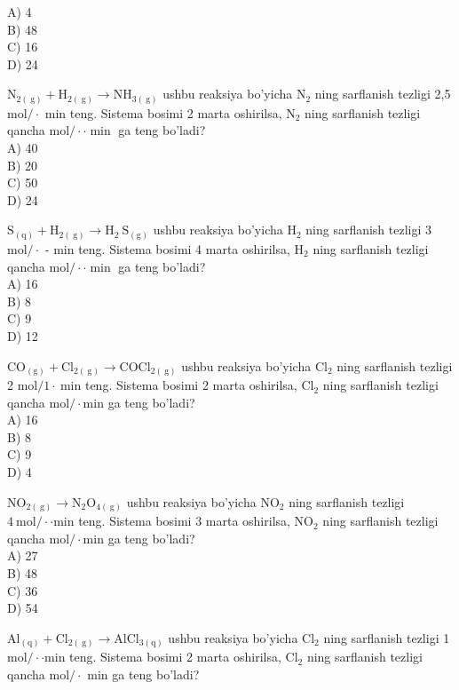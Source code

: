 A) 4\\
B) 48\\
C) 16\\
D) 24
  \item $\mathrm{N}_{2(\mathrm{~g})}+\mathrm{H}_{2(\mathrm{~g})} \rightarrow \mathrm{NH}_{3(\mathrm{~g})}$ ushbu reaksiya bo'yicha $\mathrm{N}_{2}$ ning sarflanish tezligi 2,5 $\mathrm{mol} / \cdot$ min teng. Sistema bosimi 2 marta oshirilsa, $\mathrm{N}_{2}$ ning sarflanish tezligi qancha $\mathrm{mol} / \cdot \cdot \min$ ga teng bo'ladi?\\
A) 40\\
B) 20\\
C) 50\\
D) 24
  \item $\mathrm{S}_{(\mathrm{q})}+\mathrm{H}_{2(\mathrm{~g})} \rightarrow \mathrm{H}_{2} \mathrm{~S}_{(\mathrm{g})}$ ushbu reaksiya bo'yicha $\mathrm{H}_{2}$ ning sarflanish tezligi 3 $\mathrm{mol} / \cdot$ - min teng. Sistema bosimi 4 marta oshirilsa, $\mathrm{H}_{2}$ ning sarflanish tezligi qancha $\mathrm{mol} / \cdot \cdot \min$ ga teng bo'ladi?\\
A) 16\\
B) 8\\
C) 9\\
D) 12
  \item $\mathrm{CO}_{(\mathrm{g})}+\mathrm{Cl}_{2(\mathrm{~g})} \rightarrow \mathrm{COCl}_{2(\mathrm{~g})}$ ushbu reaksiya bo'yicha $\mathrm{Cl}_{2}$ ning sarflanish tezligi 2 $\mathrm{mol} / 1 \cdot \mathrm{~min}$ teng. Sistema bosimi 2 marta oshirilsa, $\mathrm{Cl}_{2}$ ning sarflanish tezligi qancha $\mathrm{mol} / \cdot \mathrm{min}$ ga teng bo'ladi?\\
A) 16\\
B) 8\\
C) 9\\
D) 4
  \item $\mathrm{NO}_{2(\mathrm{~g})} \rightarrow \mathrm{N}_{2} \mathrm{O}_{4(\mathrm{~g})}$ ushbu reaksiya bo'yicha $\mathrm{NO}_{2}$ ning sarflanish tezligi $4 \mathrm{~mol} / \cdot \cdot \mathrm{min}$ teng. Sistema bosimi 3 marta oshirilsa, $\mathrm{NO}_{2}$ ning sarflanish tezligi qancha $\mathrm{mol} / \cdot \mathrm{min}$ ga teng bo'ladi?\\
A) 27\\
B) 48\\
C) 36\\
D) 54
  \item $\mathrm{Al}_{(\mathrm{q})}+\mathrm{Cl}_{2(\mathrm{~g})} \rightarrow \mathrm{AlCl}_{3(\mathrm{q})}$ ushbu reaksiya bo'yicha $\mathrm{Cl}_{2}$ ning sarflanish tezligi 1 $\mathrm{mol} / \cdot \cdot \mathrm{min}$ teng. Sistema bosimi 2 marta oshirilsa, $\mathrm{Cl}_{2}$ ning sarflanish tezligi qancha $\mathrm{mol} / \cdot$ min ga teng bo'ladi?\\
